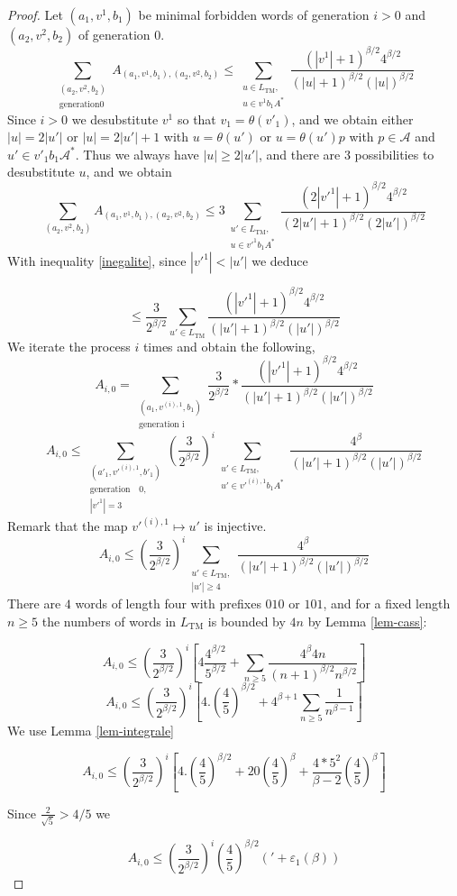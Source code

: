 \documentclass[10pt,a4paper]{amsart}
\begin{document}
\begin{proof}
Let $(a_1,v^1,b_1)$ be minimal forbidden words of generation $i>0$ and $(a_2, v^2, b_2)$ of generation $0$.
$$\sum_{\substack{(a_2,v^2,b_2)\\ \text{generation} 0}} A_{(a_1,v^1,b_1),(a_2,v^2,b_2)}\leq \sum_{\substack{u\in L_{\mathrm{TM}},\\ u\in v^1b_1A^*}}\frac{(|v^1|+1)^{\beta/2}4^{\beta/2}}{(|u|+1)^{\beta/2}(|u|)^{\beta/2}}$$
Since $i>0$ we desubstitute $v^1$ so that $v_1=\theta(v'_1)$, and we obtain either $|u|=2|u'|$ or $|u|=2|u'|+1$ with $u=\theta(u')$ or $u=\theta(u')p$ with $p\in\mathcal A$ and $u'\in v'_1 b_1\mathcal{A}^*$. Thus we always have $|u|\geq 2|u'|$, and
there are $3$ possibilities to desubstitute $u$, and we obtain
$$\sum_{(a_2,v^2,b_2)} A_{(a_1,v^1,b_1),(a_2,v^2,b_2)}\leq 3\sum_{\substack{u'\in L_{\mathrm{TM}},\\ u\in v'^1b_1A^*}}\frac{(2|v'^1|+1)^{\beta/2}4^{\beta/2}}{(2|u'|+1)^{\beta/2}(2|u'|)^{\beta/2}}$$
With inequality \eqref{inegalite}, since $|v'^1|<|u'|$ we deduce

$$\leq \frac{3}{2^{\beta/2}}\sum_{u'\in L_{\mathrm{TM}}} \frac{(|v'^1|+1)^{\beta/2}4^{\beta/2}}{(|u'|+1)^{\beta/2}(|u'|)^{\beta/2}} $$
We iterate the process $i$ times and obtain the following,
 $$A_{i,0}=\sum_{\substack{(a_1, v^{(i),1},b_1)\\ \text{generation i}}} \frac{3}{2^{\beta/2}}*\frac{(|v'^1|+1)^{\beta/2}4^{\beta/2}}{(|u'|+1)^{\beta/2}(|u'|)^{\beta/2}}$$
 $$A_{i,0}\leq \sum_{\substack{(a'_1,v'^{(i),1},b'_1)\\ \text{generation}\quad 0,\\ |v'^1|=3}}(\frac{3}{2^{\beta/2}})^i\sum_{\substack{u'\in L_{\mathrm{TM}},\\ u'\in v'^{(i),1}b_1A^*}} \frac{4^\beta}{(|u'|+1)^{\beta/2}(|u'|)^{\beta/2}}$$
Remark that the map $v'^{(i),1}\mapsto u'$ is injective.
$$A_{i,0}\leq (\frac{3}{2^{\beta/2}})^i\sum_{\substack{u'\in L_{\mathrm{TM}},\\ |u'|\geq 4}} \frac{4^\beta}{(|u'|+1)^{\beta/2}(|u'|)^{\beta/2}}
$$
There are $4$ words of length four with prefixes $010$ or $101$, and for a fixed length $n\geq 5$ the numbers of words in $L_{\mathrm{TM}}$ is bounded by $4n$ by Lemma \ref{lem-cass}:

$$A_{i,0}\leq (\frac{3}{2^{\beta/2}})^i[4\frac{4^{\beta/2}}{5^{\beta/2}}+\sum_{n\geq 5} \frac{4^\beta 4n}{(n+1)^{\beta/2}n^{\beta/2}}]$$
$$A_{i,0}\leq (\frac{3}{2^{\beta/2}})^i[4. (\frac{4}{5})^{\beta/2}+4^{\beta+1}\sum_{n\geq 5} \frac{1}{n^{\beta-1}}]$$
We use Lemma \ref{lem-integrale}

$$A_{i,0}\leq (\frac{3}{2^{\beta/2}})^i[4. (\frac{4}{5})^{\beta/2}+
20(\frac{4}{5})^{\beta}+
\frac{4*5^2}{\beta-2}(\frac{4}{5})^{\beta}]$$

Since $\frac{2}{\sqrt 5}>4/5$ we 

$$A_{i,0}\leq (\frac{3}{2^{\beta/2}})^i(\frac{4}{5})^{\beta/2}('+\varepsilon_1(\beta))$$




\end{proof}
\end{document}
